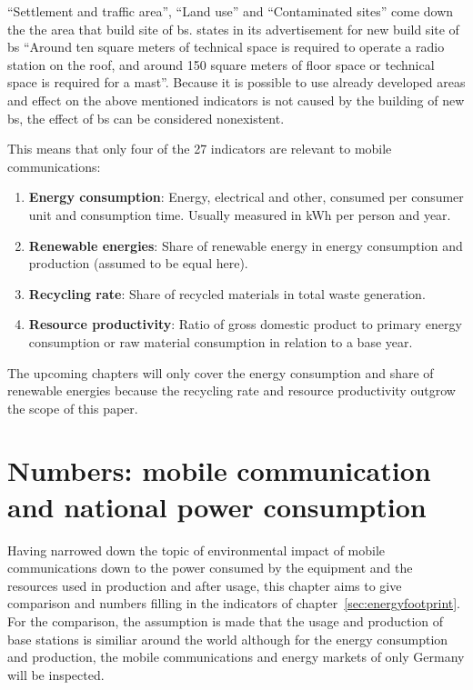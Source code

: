 \documentclass[11pt,a4paper]{article}
\begin{document}
\enquote{Settlement and traffic area}, \enquote{Land use} and \enquote{Contaminated sites} come down the the area that build site of  \acrshort{bs}.
\citep{BSStandort} states in its advertisement for new build site of \acrshort{bs} \enquote{Around ten square meters of technical space is required to operate a radio station on the roof, and around 150 square meters of floor space or technical space is required for a mast}.
Because it is possible to use already developed areas and effect on the above mentioned indicators is not caused by the building of new \acrshort{bs}, the effect of \acrshort{bs} can be considered nonexistent.

This means that only four of the 27 indicators are relevant to mobile communications:
\begin{enumerate}
  \item \textbf{Energy consumption}: Energy, electrical and other, consumed per consumer unit and consumption time. Usually measured in kWh per person and year.
  \item \textbf{Renewable energies}: Share of renewable energy in energy consumption and production (assumed to be equal here).
  \item \textbf{Recycling rate}: Share of recycled materials in total waste generation.
  \item \textbf{Resource productivity}: Ratio of gross domestic product to primary energy consumption or raw material consumption in relation to a base year.
\end{enumerate}

The upcoming chapters will only cover the energy consumption and share of renewable energies because the recycling rate and resource productivity outgrow the scope of this paper.

\section{Numbers: mobile communication and national power consumption}\label{sec:influence}

Having narrowed down the topic of environmental impact of mobile communications down to the power consumed by the equipment and the resources used in production and after usage, this chapter aims to give comparison and numbers filling in the indicators of chapter~\ref{sec:energyfootprint}.
For the comparison, the assumption is made that the usage and production of base stations is similiar around the world although for the energy consumption and production, the mobile communications and energy markets of only Germany will be inspected. 
\end{document}
